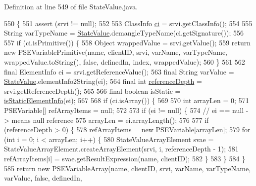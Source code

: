 Definition at line 549 of file State\+Value.\+java.


\begin{DoxyCode}
550                                    \{
551     assert (srvi != null);
552 
553     ClassInfo \hyperlink{classgov_1_1nasa_1_1jpf_1_1inspector_1_1server_1_1programstate_1_1_state_value_a0eb4aa1e630ed6372dcfb8c41ae7edc5}{ci} = srvi.getClassInfo();
554 
555     String varTypeName = \hyperlink{classgov_1_1nasa_1_1jpf_1_1inspector_1_1server_1_1programstate_1_1_state_value_aef9d3691f1dd70f6458c47ce8bc6943c}{StateValue}.demangleTypeName(ci.getSignature());
556 
557     \textcolor{keywordflow}{if} (ci.isPrimitive()) \{
558       Object wrappedValue = srvi.getValue();
559       \textcolor{keywordflow}{return} \textcolor{keyword}{new} PSEVariablePrimitive(name, clientID, srvi, varName, varTypeName, wrappedValue.toString(), \textcolor{keyword}{
      false}, definedIn, index, wrappedValue);
560     \}
561 
562     \textcolor{keyword}{final} ElementInfo ei = srvi.getReferenceValue();
563     \textcolor{keyword}{final} String varValue = \hyperlink{classgov_1_1nasa_1_1jpf_1_1inspector_1_1server_1_1programstate_1_1_state_value_aef9d3691f1dd70f6458c47ce8bc6943c}{StateValue}.elementInfo2String(ei);
564     \textcolor{keyword}{final} \textcolor{keywordtype}{int} \hyperlink{classgov_1_1nasa_1_1jpf_1_1inspector_1_1server_1_1programstate_1_1_state_node_a55683618625dae46e8aa68d95811d6bb}{referenceDepth} = srvi.getReferenceDepth();
565 
566     \textcolor{keyword}{final} \textcolor{keywordtype}{boolean} isStatic = \hyperlink{classgov_1_1nasa_1_1jpf_1_1inspector_1_1server_1_1programstate_1_1_state_value_a25dfd1e417420303104033dd3342c659}{isStaticElementInfo}(ei);
567 
568     \textcolor{keywordflow}{if} (ci.isArray()) \{
569 
570       \textcolor{keywordtype}{int} arrayLen = 0;
571       PSEVariable[] refArrayItems = null;
572 
573       \textcolor{keywordflow}{if} (ei != null) \{
574         \textcolor{comment}{// ei == null -> means null reference}
575         arrayLen = ei.arrayLength();
576 
577         \textcolor{keywordflow}{if} (referenceDepth > 0) \{
578           refArrayItems = \textcolor{keyword}{new} PSEVariable[arrayLen];
579           \textcolor{keywordflow}{for} (\textcolor{keywordtype}{int} i = 0; i < arrayLen; i++) \{
580             StateValueArrayElement svae = StateValueArrayElement.createArrayElement(srvi, i, referenceDepth
       - 1);
581             refArrayItems[i] = svae.getResultExpression(name, clientID);
582           \}
583         \}
584       \}
585       \textcolor{keywordflow}{return} \textcolor{keyword}{new} PSEVariableArray(name, clientID, srvi, varName, varTypeName, varValue, \textcolor{keyword}{false}, definedIn, 

\end{DoxyCode}
